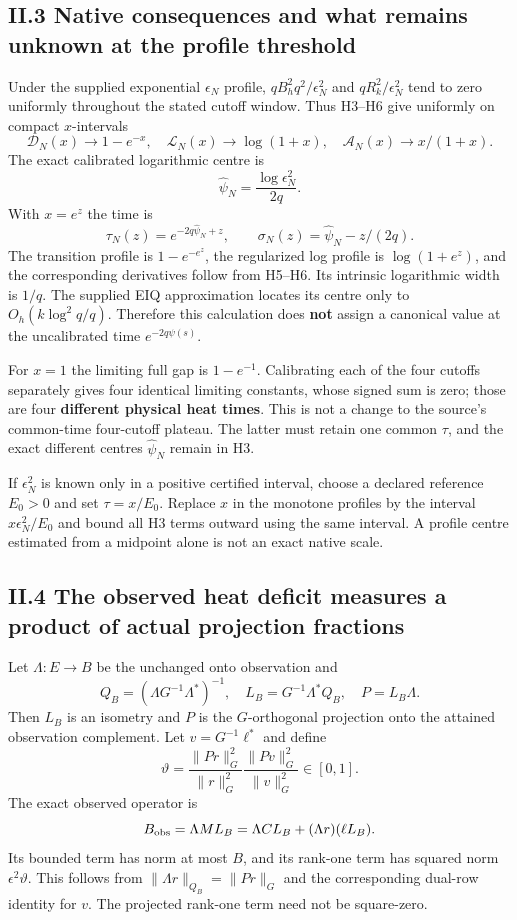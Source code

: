 \documentclass[11pt]{article}
\begin{document}
\subsection{II.3 Native consequences and what remains unknown at the profile threshold}\label{ii.3-native-consequences-and-what-remains-unknown-at-the-profile-threshold}

Under the supplied exponential \(\epsilon_N\) profile, \(qB_h^2q^2/\epsilon_N^2\) and \(qR_k^2/\epsilon_N^2\) tend to zero uniformly throughout the stated cutoff window. Thus H3--H6 give uniformly on compact \(x\)-intervals \[
 \mathcal D_N(x)\to1-e^{-x},\quad
 \mathcal L_N(x)\to\log(1+x),\quad
 \mathcal A_N(x)\to x/(1+x).
 \tag{H7}
\] The exact calibrated logarithmic centre is \[
 \widehat\psi_N=\frac{\log\epsilon_N^2}{2q}.
\] With \(x=e^z\) the time is \[
 \tau_N(z)=e^{-2q\widehat\psi_N+z},\qquad
 \sigma_N(z)=\widehat\psi_N-z/(2q).
\] The transition profile is \(1-e^{-e^z}\), the regularized log profile is \(\log(1+e^z)\), and the corresponding derivatives follow from H5--H6. Its intrinsic logarithmic width is \(1/q\). The supplied EIQ approximation locates its centre only to \(O_h(k\log^2q/q)\). Therefore this calculation does \textbf{not} assign a canonical value at the uncalibrated time \(e^{-2q\psi(s)}\).

For \(x=1\) the limiting full gap is \(1-e^{-1}\). Calibrating each of the four cutoffs separately gives four identical limiting constants, whose signed sum is zero; those are four \textbf{different physical heat times}. This is not a change to the source's common-time four-cutoff plateau. The latter must retain one common \(\tau\), and the exact different centres \(\widehat\psi_N\) remain in H3.

If \(\epsilon_N^2\) is known only in a positive certified interval, choose a declared reference \(E_0>0\) and set \(\tau=x/E_0\). Replace \(x\) in the monotone profiles by the interval \(x\epsilon_N^2/E_0\) and bound all H3 terms outward using the same interval. A profile centre estimated from a midpoint alone is not an exact native scale.

\subsection{II.4 The observed heat deficit measures a product of actual projection fractions}\label{ii.4-the-observed-heat-deficit-measures-a-product-of-actual-projection-fractions}

Let \(\Lambda:E\to B\) be the unchanged onto observation and \[
 Q_B=(\Lambda G^{-1}\Lambda^*)^{-1},\quad
 L_B=G^{-1}\Lambda^*Q_B,\quad P=L_B\Lambda.
\] Then \(L_B\) is an isometry and \(P\) is the \(G\)-orthogonal projection onto the attained observation complement. Let \(v=G^{-1}\ell^*\) and define \[
 \vartheta=
 \frac{\|Pr\|_G^2}{\|r\|_G^2}
 \frac{\|Pv\|_G^2}{\|v\|_G^2}\in[0,1].
 \tag{H8}
\] The exact observed operator is \[
 B_{\rm obs}=\Lambda ML_B=\Lambda CL_B+(\Lambda r)(\ell L_B).
\] Its bounded term has norm at most \(B\), and its rank-one term has squared norm \(\epsilon^2\vartheta\). This follows from \(\|\Lambda r\|_{Q_B}=\|Pr\|_G\) and the corresponding dual-row identity for \(v\). The projected rank-one term need not be square-zero.
\end{document}
